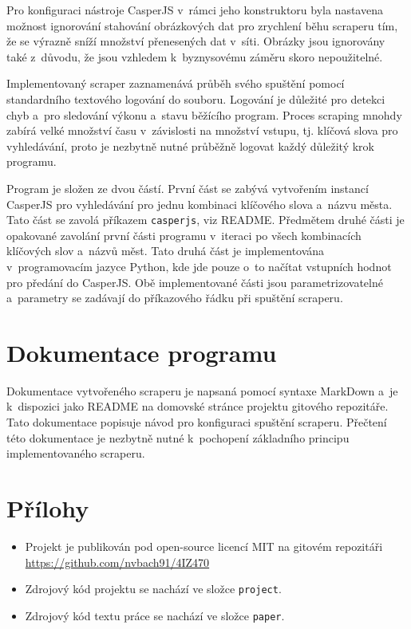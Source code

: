 \documentclass[11pt,a4paper]{article}
\begin{document}
Pro konfiguraci nástroje CasperJS v~rámci jeho konstruktoru byla nastavena možnost ignorování stahování obrázkových dat pro zrychlení běhu scraperu tím, že se výrazně sníží množství přenesených dat v~síti. Obrázky jsou ignorovány také z~důvodu, že jsou vzhledem k~byznysovému záměru skoro nepoužitelné.

Implementovaný scraper zaznamenává průběh svého spuštění pomocí standardního textového logování do souboru. Logování je důležité pro detekci chyb a~pro sledování výkonu a~stavu běžícího program. Proces scraping mnohdy zabírá velké množství času v~závislosti na množství vstupu, tj. klíčová slova pro vyhledávání, proto je nezbytně nutné průběžně logovat každý důležitý krok programu.

Program je složen ze dvou částí. První část se zabývá vytvořením instancí CasperJS pro vyhledávání pro jednu kombinaci klíčového slova a~názvu města. Tato část se zavolá příkazem \texttt{casperjs}, viz README. Předmětem druhé části je opakované zavolání první části programu v~iteraci po všech kombinacích klíčových slov a~názvů měst. Tato druhá část je implementována v~programovacím jazyce Python, kde jde pouze o~to načítat vstupních hodnot pro předání do CasperJS. Obě implementované části jsou parametrizovatelné a~parametry se zadávají do příkazového řádku při spuštění scraperu.


\section{Dokumentace programu}
Dokumentace vytvořeného scraperu je napsaná pomocí syntaxe MarkDown a~je k~dispozici jako README na domovské stránce projektu gitového repozitáře. Tato dokumentace popisuje návod pro konfiguraci spuštění scraperu. Přečtení této dokumentace je nezbytně nutné k~pochopení základního principu implementovaného scraperu.


\newpage






\section*{Přílohy}
\begin{itemize}
\item Projekt je publikován pod open-source licencí MIT na gitovém repozitáři \\ \url{https://github.com/nvbach91/4IZ470} 
\item Zdrojový kód projektu se nachází ve složce \texttt{project}.
\item Zdrojový kód textu práce se nachází ve složce \texttt{paper}.
\end{itemize}
\end{document}
